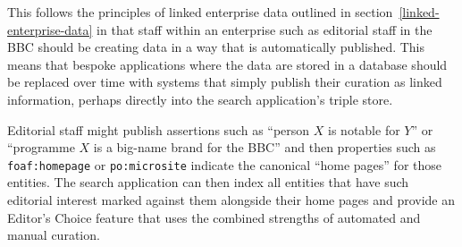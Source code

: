 This follows the principles of linked enterprise data outlined in
section~\ref{linked-enterprise-data} in that staff within
an enterprise such as editorial staff in the BBC should be
creating data in a way that is automatically published. This
means that bespoke applications where the data are stored in
a database should be replaced over time with systems that
simply publish their curation as linked information, perhaps
directly into the search application's triple store.

Editorial staff might publish assertions such as
``person $X$ is notable for $Y$'' or
``programme $X$ is a big-name brand for the BBC'' and then
properties such as \texttt{foaf:homepage}\cite{brickley2012foaf} or
\texttt{po:microsite}\cite{raimond2009bbc} indicate the canonical
``home pages'' for those entities. The search application can
then index all entities that have such editorial interest marked
against them alongside their home pages and provide an
Editor's Choice feature that uses the combined strengths
of automated and manual curation.
